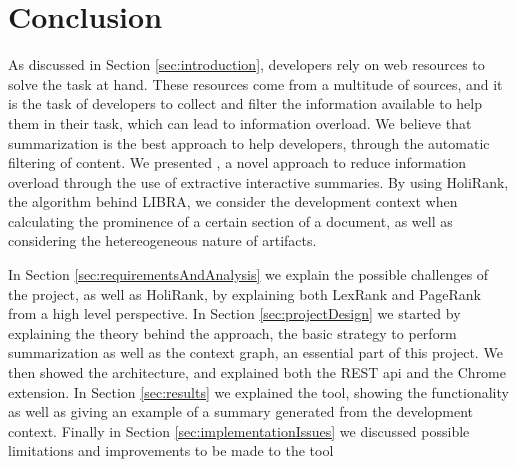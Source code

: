 \section{Conclusion}\label{sec:conclusion}

As discussed in Section \ref{sec:introduction}, developers rely on web resources to solve the task at hand. These resources come from a multitude of sources, and it is the task of developers to collect and filter the information available to help them in their task, which can lead to information overload. We believe that summarization is the best approach to help developers, through the automatic filtering of content. We presented \projectName, a novel approach to reduce information overload through the use of extractive interactive summaries. By using HoliRank, the algorithm behind LIBRA, we consider the development context when calculating the prominence of a certain section of a document, as well as considering the hetereogeneous nature of artifacts. 


In Section \ref{sec:requirementsAndAnalysis} we explain the possible challenges of the project, as well as HoliRank, by explaining both LexRank and PageRank from a high level perspective. 
In Section \ref{sec:projectDesign} we started by explaining the theory behind the approach, the basic strategy to perform summarization as well as the context graph, an essential part of this project. We then showed the architecture, and explained both the REST api and the Chrome extension. In Section \ref{sec:results} we explained the tool, showing the functionality as well as giving an example of a summary generated from the development context. Finally in Section \ref{sec:implementationIssues} we discussed possible limitations and improvements to be made to the tool